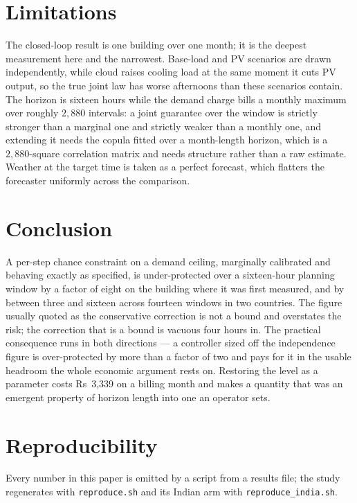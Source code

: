 \documentclass[conference]{IEEEtran}
\newcommand{\rupee}[1]{\textsf{Rs}~#1}
\begin{document}
\section{Limitations}

The closed-loop result is one building over one month; it is the deepest
measurement here and the narrowest. Base-load and PV scenarios are drawn
independently, while cloud raises cooling load at the same moment it cuts PV
output, so the true joint law has worse afternoons than these scenarios
contain. The horizon is sixteen hours while the demand charge bills a monthly
maximum over roughly $2{,}880$ intervals: a joint guarantee over the window is
strictly stronger than a marginal one and strictly weaker than a monthly one,
and extending it needs the copula fitted over a month-length horizon, which is
a $2{,}880$-square correlation matrix and needs structure rather than a raw
estimate. Weather at the target time is taken as a perfect forecast, which
flatters the forecaster uniformly across the comparison.

\section{Conclusion}

A per-step chance constraint on a demand ceiling, marginally calibrated and
behaving exactly as specified, is under-protected over a sixteen-hour planning
window by a factor of eight on the building where it was first measured, and by
between three and sixteen across fourteen windows in two countries. The figure
usually quoted as the conservative correction is not a bound and overstates the
risk; the correction that is a bound is vacuous four hours in. The practical
consequence runs in both directions --- a controller sized off the independence
figure is over-protected by more than a factor of two and pays for it in the
usable headroom the whole economic argument rests on. Restoring the level as a
parameter costs \rupee{3{,}339} on a billing month and makes a quantity that
was an emergent property of horizon length into one an operator sets.

\section*{Reproducibility}

Every number in this paper is emitted by a script from a results file; the
study regenerates with \texttt{reproduce.sh} and its Indian arm with
\texttt{reproduce\_india.sh}. %



\end{document}

